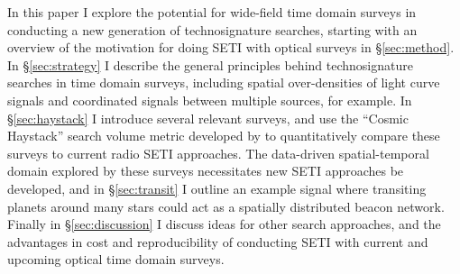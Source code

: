 \documentclass[twocolumn]{aastex62}
\begin{document}
In this paper I explore the potential for wide-field time domain surveys in conducting a new generation of technosignature searches, starting with an overview of the motivation for doing SETI with optical surveys in \S\ref{sec:method}.
In \S\ref{sec:strategy} I describe the general principles behind technosignature searches in time domain surveys, including spatial over-densities of light curve signals and coordinated signals between multiple sources, for example.
In \S\ref{sec:haystack} I introduce several relevant surveys, and use the ``Cosmic Haystack'' search volume metric developed by \citet{wright2018c} to quantitatively compare these surveys to current radio SETI approaches. 
The data-driven spatial-temporal domain explored by these surveys necessitates new SETI approaches be developed, and in \S\ref{sec:transit} I outline an example signal where transiting planets around many stars could act as a spatially distributed beacon network.
Finally in \S\ref{sec:discussion} I discuss ideas for other search approaches, and the advantages in cost and reproducibility of conducting SETI with current and upcoming optical time domain surveys.

\end{document}
